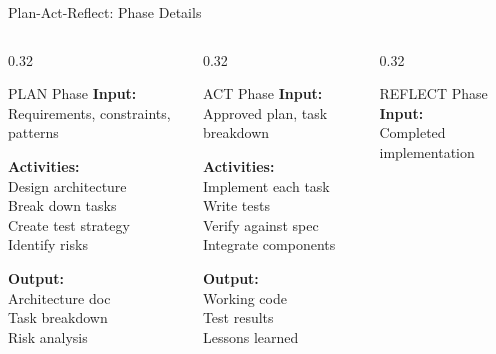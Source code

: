 \documentclass[aspectratio=169,10pt]{beamer}
\begin{document}
\begin{frame}{Plan-Act-Reflect: Phase Details}
    \begin{columns}[T]
        \begin{column}{0.32\textwidth}
            \begin{block}{PLAN Phase}
                \textbf{Input:}\\
                Requirements, constraints, patterns

                \textbf{Activities:}\\
                Design architecture\\
                Break down tasks\\
                Create test strategy\\
                Identify risks

                \textbf{Output:}\\
                Architecture doc\\
                Task breakdown\\
                Risk analysis
            \end{block}
        \end{column}
        \begin{column}{0.32\textwidth}
            \begin{block}{ACT Phase}
                \textbf{Input:}\\
                Approved plan, task breakdown

                \textbf{Activities:}\\
                Implement each task\\
                Write tests\\
                Verify against spec\\
                Integrate components

                \textbf{Output:}\\
                Working code\\
                Test results\\
                Lessons learned
            \end{block}
        \end{column}
        \begin{column}{0.32\textwidth}
            \begin{block}{REFLECT Phase}
                \textbf{Input:}\\
                Completed implementation


\end{block}
\end{column}
\end{columns}
\end{frame}
\end{document}
